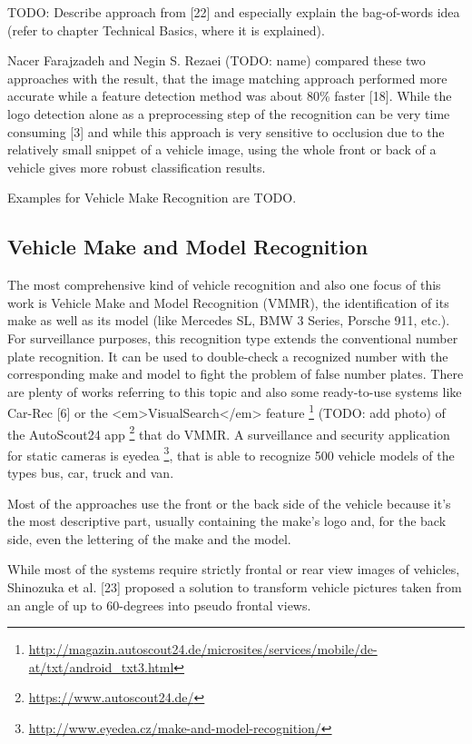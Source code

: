 TODO: Describe approach from [22] and especially explain the bag-of-words idea (refer to chapter Technical Basics, where it is explained).

Nacer Farajzadeh and Negin S. Rezaei (TODO: name) compared these two approaches with the result, that the image matching approach performed more accurate while a feature detection method was about 80\% faster [18]. While the logo detection alone as a preprocessing step of the recognition can be very time consuming [3] and while this approach is very sensitive to occlusion due to the relatively small snippet of a vehicle image, using the whole front or back of a vehicle gives more robust classification results.

Examples for Vehicle Make Recognition are TODO.

\subsection{Vehicle Make and Model Recognition}
The most comprehensive kind of vehicle recognition and also one focus of this work is Vehicle Make and Model Recognition (VMMR), the identification of its make as well as its model (like Mercedes SL, BMW 3 Series, Porsche 911, etc.). For surveillance purposes, this recognition type extends the conventional number plate recognition. It can be used to double-check a recognized number with the corresponding make and model to fight the problem of false number plates. There are plenty of works referring to this topic and also some ready-to-use systems like Car-Rec [6] or the <em>VisualSearch</em> feature \footnote{\url{http://magazin.autoscout24.de/microsites/services/mobile/de-at/txt/android_txt3.html}} (TODO: add photo) of the AutoScout24 app \footnote{\url{https://www.autoscout24.de/}} that do VMMR.
A surveillance and security application for static cameras is eyedea \footnote{\url{http://www.eyedea.cz/make-and-model-recognition/}}, that is able to recognize 500 vehicle models of the types bus, car, truck and van.

Most of the approaches use the front or the back side of the vehicle because it’s the most descriptive part, usually containing the make’s logo and, for the back side, even the lettering of the make and the model.

While most of the systems require strictly frontal or rear view images of vehicles, Shinozuka et al. [23] proposed a solution to transform vehicle pictures taken from an angle of up to 60-degrees into pseudo frontal views.

